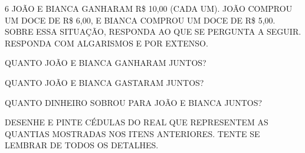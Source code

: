 
\pagebreak

\num{6} JOÃO E BIANCA GANHARAM R\$ 10,00 (CADA UM). JOÃO COMPROU UM DOCE DE R\$ 6,00,
E BIANCA COMPROU UM DOCE DE R\$ 5,00. SOBRE ESSA SITUAÇÃO, RESPONDA AO QUE SE PERGUNTA A SEGUIR. RESPONDA COM ALGARISMOS E POR EXTENSO.

\begin{escolha}
\item QUANTO JOÃO E BIANCA GANHARAM JUNTOS?


\item QUANTO JOÃO E BIANCA GASTARAM JUNTOS?


\item QUANTO DINHEIRO SOBROU PARA JOÃO E BIANCA JUNTOS?


\item DESENHE E PINTE CÉDULAS DO REAL QUE REPRESENTEM AS QUANTIAS MOSTRADAS NOS ITENS ANTERIORES. TENTE SE LEMBRAR DE TODOS OS DETALHES.
\end{escolha}


